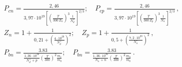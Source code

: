 \documentclass[12pt,a4paper,titlepage,oneside]{book}
\numberwithin{equation}{part}
\begin{document}
\begin{subequations} \label{eqK9}
    \begin{align}
      &P_{cn} = \frac{2,46}{3,97 \cdot 10^{19} \left[\left( \frac{T}{300\,Z_n} \right)^3  \frac{1}{N_d^+}\right]^{2/3}}; \quad
 P_{cp} = \frac{2,46}{3,97 \cdot 10^{19} \left[\left( \frac{T}{300\,Z_p} \right)^3  \frac{1}{N_a^-}\right]^{2/3}}\,, \label{eqK9a} \\
      &Z_n = 1 + \frac{1}{0,21 + \left( \frac{4 \cdot 10^{20}}{N_d^+} \right)^2}; \quad
 Z_p = 1 + \frac{1}{0,5 + \left( \frac{7,2 \cdot 10^{20}}{N_a^-} \right)^2}\,, \label{eqK9b}\\
 &P_{bn} =\frac{3.83}{\frac{1,36 \cdot 10^{26}}{N_d^+ + p} \left( \frac{T}{300} \right)^2  \frac{m_e}{m_0}}; \quad
 P_{bn} =\frac{3.83}{\frac{1,36 \cdot 10^{26}}{N_a^- + n} \left( \frac{T}{300} \right)^2  \frac{m_h}{m_0}}\,. \label{eqK9c}
    \end{align}
\end{subequations}
%
%
%
%
%
%
\end{document}
